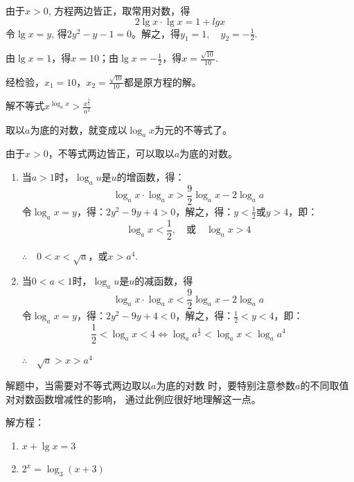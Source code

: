 \begin{solution}
    由于$x>0$, 方程两边皆正，取常用对数，得
$$2\lg x\cdot \lg x=1+lg x$$
令$\lg x= y$, 得$2y^2- y- 1= 0$。解之，得$y_1=1,\quad y_2=-\frac{1}{2}$.

由$\lg x=1$，得$x=10$；由$\lg x=-\frac{1}{2}$，得$x=\frac{\sqrt{10}}{10}$.

经检验，$x_1=10$，$x_2=\frac{\sqrt{10}}{10}$都是原方程的解。
\end{solution}

\begin{example}
    解不等式$x^{\log_a x}>\frac{x^{\tfrac{9}{2}}}{a^2}$
\end{example}

\begin{analyze}
    取以$a$为底的对数，就变成以$\log_a x$为元的不等式了。
\end{analyze}

\begin{solution}
由于$x>0$，不等式两边皆正，可以取以$a$为底的对数。
\begin{enumerate}
    \item 当$a>1$时，$\log_a u$是$u$的增函数，得：
    \[\log_a x\cdot \log_a x>\frac{9}{2}\log_a x-2\log_a a\]
令$\log_a x=y$，得：$2y^2-9y+4>0$，解之，得：$y<\frac{1}{2}$或$y>4$，即：
\[\log_a x<\frac{1}{2},\quad \text{或}\quad \log_a x>4\]

$\therefore\quad 0<x<\sqrt{a}$，或$x>a^4$.

\item 当$0<a<1$时，$\log_a u$是$u$的减函数，得
\[\log_a x\cdot \log_a x< \frac{9}{2}\log_a x-2\log_a a\]
令$\log_a x=y$，得：$2y^2-9y+4<0$，解之，得：$\frac{1}{2}<y<4$，即：
\[\frac{1}{2}<\log_a x<4\Longleftrightarrow \log_a a^{\tfrac{1}{2}}<\log_a x<\log_a a^4\]

$\therefore\quad \sqrt{a}>x>a^4$
\end{enumerate}
\end{solution}

\begin{note}
    解题中，当需要对不等式两边取以$a$为底的对数
时，要特别注意参数$a$的不同取值对对数函数增减性的影响，
通过此例应很好地理解这一点。
\end{note}



\begin{example}
解方程：
\begin{multicols}{2}
\begin{enumerate}[(1)]
    \item $x+\lg x=3$
    \item $2^x=\log_3(x+3)$
\end{enumerate}
\end{multicols}
\end{example}

